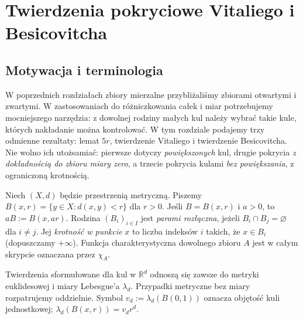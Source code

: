 \chapter{Twierdzenia pokryciowe Vitaliego i Besicovitcha}
\label{ch:covering-24}

\section{Motywacja i terminologia}
W poprzednich rozdziałach zbiory mierzalne przybliżaliśmy
zbiorami otwartymi i zwartymi. W zastosowaniach do
różniczkowania całek i miar potrzebujemy mocniejszego narzędzia:
z dowolnej rodziny małych kul należy wybrać takie kule, których
nakładanie można kontrolować. W tym rozdziale podajemy trzy
odmienne rezultaty: lemat $5r$, twierdzenie Vitaliego i twierdzenie
Besicovitcha. Nie wolno ich utożsamiać: pierwsze dotyczy
\emph{powiększonych} kul, drugie pokrycia \emph{z dokładnością do
zbioru miary zero}, a trzecie pokrycia kulami \emph{bez powiększania},
z ograniczoną krotnością.

\begin{definicja}
\label{def:balls-24}
Niech $(X,d)$ będzie przestrzenią metryczną. Piszemy
$B(x,r)=\{y\in X:d(x,y)<r\}$ dla $r>0$.
Jeśli $B=B(x,r)$ i $a>0$, to $aB:=B(x,ar)$.
Rodzina $(B_i)_{i\in I}$ jest \emph{parami rozłączna}, jeżeli
$B_i\cap B_j=\varnothing$ dla $i\ne j$.
Jej \emph{krotność w punkcie} $x$ to liczba indeksów $i$ takich,
że $x\in B_i$ (dopuszczamy $+\infty$).
Funkcja charakterystyczna dowolnego zbioru $A$ jest w całym
skrypcie oznaczana przez $\chi_A$.
\end{definicja}

\begin{uwaga}
Twierdzenia sformułowane dla kul w $\mathbb R^d$ odnoszą się
zawsze do metryki euklidesowej i miary Lebesgue'a $\lambda_d$.
Przypadki metryczne bez miary rozpatrujemy oddzielnie.
Symbol $v_d:=\lambda_d(B(0,1))$ oznacza objętość kuli jednostkowej;
$\lambda_d(B(x,r))=v_dr^d$.
\end{uwaga}

